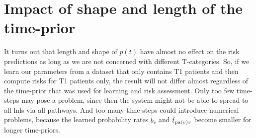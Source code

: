 \documentclass[\relativeRoot/main.tex]{subfiles}
\begin{document}
\section{Impact of shape and length of the time-prior}
\label{sec:unilateral:tprior}

It turns out that length and shape of $p(t)$ have almost no effect on the risk predictions as long as we are not concerned with different T-categories. So, if we learn our parameters from a dataset that only contains T1 patients and then compute risks for T1 patients only, the result will not differ almost regardless of the time-prior that was used for learning and risk assessment. Only too few time-steps may pose a problem, since then the system might not be able to spread to all \glspl{lnl} via all pathways. And too many time-steps could introduce numerical problems, because the learned probability rates $\tilde{b}_v$ and $\tilde{t}_{\operatorname{pa}(v)v}$  become smaller for longer time-priors.
\end{document}
